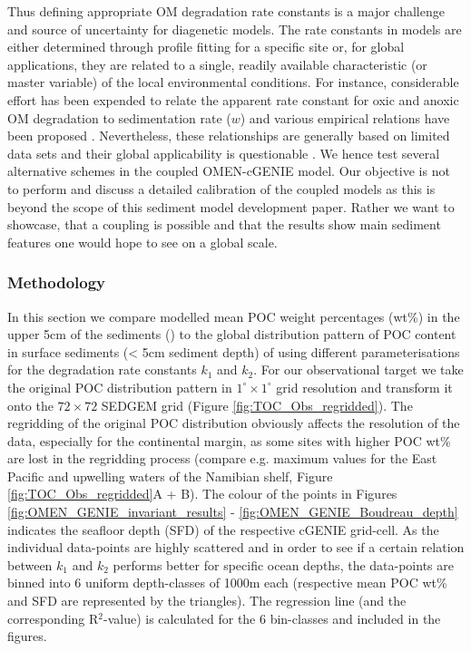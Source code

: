 \documentclass[gmd, manuscript]{copernicus}
\begin{document}
Thus defining appropriate OM degradation rate constants is a major challenge and source of uncertainty for diagenetic models. The rate constants in models are either determined through profile fitting for a specific site or, 
for global applications, they are related to a single, readily available characteristic (or master variable) of the local environmental conditions. 
For instance, considerable effort has been expended to relate the apparent rate constant for oxic and 
anoxic OM degradation to sedimentation rate ($w$) and various empirical relations have been proposed \citep{toth_organic_1977, tromp_global_1995, boudreau1997diagenetic, stolpovsky_toward_2015}. 
Nevertheless, these relationships are generally based on limited data sets and their global applicability is questionable \citep{arndt_quantifying_2013}. 
We hence test several alternative schemes in the coupled OMEN-cGENIE model. 
Our objective is not to perform and discuss a detailed calibration of the coupled models as this is beyond the scope of this sediment model development paper. Rather we want to showcase, that a coupling is
possible and that the results show main sediment features one would hope to see on a global scale. 

\subsubsection{Methodology}
In this section we compare modelled mean POC weight percentages (wt\%) in the upper 5cm of the sediments  () to the global distribution pattern of POC content in surface sediments 
(< 5cm sediment depth) of \citet{seiter_organic_2004} using different parameterisations for the degradation rate constants $k_1$ and $k_2$. 
For our observational target we take the original POC distribution pattern in $1^\circ \times 1^\circ$ grid resolution \citep[interpolated from > 5500 measurements, compare][]{seiter_organic_2004} and transform it onto the $72\times 72$ SEDGEM grid 
(Figure \ref{fig:TOC_Obs_regridded}). The regridding of the original POC distribution obviously affects the resolution of the data, especially for the continental margin, as some sites with higher POC wt\% are lost in the 
regridding process (compare e.g. maximum values for the East Pacific and upwelling waters of the Namibian shelf, Figure \ref{fig:TOC_Obs_regridded}A + B). 
The colour of the points in Figures \ref{fig:OMEN_GENIE_invariant_results} - \ref{fig:OMEN_GENIE_Boudreau_depth} %
indicates the seafloor depth (SFD) of the respective cGENIE grid-cell. 
As the individual data-points are highly scattered and 
in order to see if a certain relation between $k_1$ and $k_2$ performs better for specific ocean depths, the data-points are binned into 6 uniform depth-classes of 1000m each (respective mean POC wt\% and SFD are represented by 
the triangles). The regression line (and the corresponding R$^2$-value) is calculated for the 6 bin-classes and included in the figures.
\end{document}
